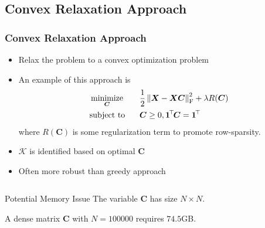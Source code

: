 \documentclass[10pt,xcolor={usenames,dvipsnames,table}]{beamer}
\def\blue{\color{blue}}
\newcommand{\norm}[1]{\left\lVert#1\right\rVert}
\newcommand{\T}{\!\top\!}
\DeclareMathOperator*{\minimize}{minimize}
\newcommand{\citep}[1]{{\blue \scriptsize \parencite{#1}}}
\begin{document}
\subsection{Convex Relaxation Approach}%
\label{sub:convex_relaxation_approach}


\begin{frame}
    \frametitle{Convex Relaxation Approach}
    \begin{itemize}
        \item Relax the problem to a convex optimization problem \citep{gillis2018afast,gillis2014robust,gillis2013robustness,recht2012factoring,Elhamifar2012,Ammanouil2014blind}
        \item An example of this approach is \citep{esser2012convex,fu2015robust,gillis2018afast}
    \begin{alignat*}{2}
        & \minimize_{\bm{C}} \quad && \dfrac{1}{2} \norm{\bm{X} - \bm{X}\bm{C}}_{\rm F}^2 + \lambda R(\bm{C}) \\
        & \text{\rm subject to} && \bm{C} \geq 0, \bm{1}^{\T}\bm{C} = \bm{1}^{\T}
    \end{alignat*}
    where $R(\bm{C})$ is some regularization term to promote row-sparsity.
\item $\mathcal{K}$ is identified based on optimal $\bm{C}$
\item Often more robust than greedy approach
    \end{itemize}

    \begin{columns}
        \begin{column}{0.6\textwidth}
        \begin{alertblock}{Potential Memory Issue}
            The variable $\bm{C}$ has size $N \times N$.
        \end{alertblock}
        A dense matrix $\bm{C}$ with $N=100000$ requires  $74.5$GB.


\end{column}
\end{columns}
\end{frame}
\end{document}
